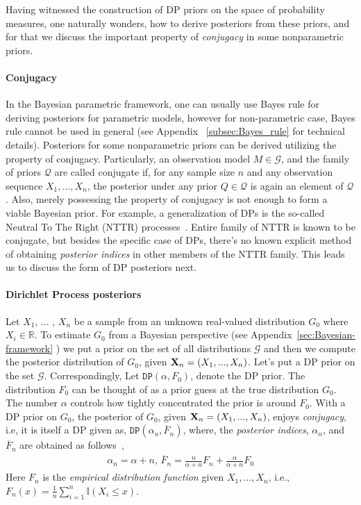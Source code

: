 \documentclass[10pt]{article}
\def\R{\mathbb{R}}
\newcommand{\DP}{\texttt{DP}}
\begin{document}
Having witnessed the construction of DP priors on the space of probability measures, one naturally wonders, how to derive posteriors from these priors, and for that we discuss the important property of \textit{conjugacy} in some nonparametric priors.

\paragraph{Conjugacy} In the Bayesian parametric framework, one can usually use Bayes rule for deriving posteriors for parametric models, however for non-parametric case, Bayes rule cannot be used in general (see Appendix ~\ref{subsec:Bayes_rule} for technical details). Posteriors for some nonparametric priors can be derived utilizing the property of conjugacy. Particularly, an observation model $M \in \mathcal{G}$, and the family of priors $\mathcal{Q}$ are called conjugate if, for any sample size $n$ and any observation sequence $X_{1}, . . ., X_{n}$, the posterior under any prior $Q\in \mathcal{Q}$ is again an element of $\mathcal{Q}$. Also, merely possessing the property of conjugacy is not enough to form a viable Bayesian prior.  For example, a generalization of DPs is the so-called Neutral To The Right (NTTR) processes~\citep{dey2003some}. Entire family of NTTR is  known to be conjugate, but besides the specific case of DPs, there's no known explicit method of obtaining \textit{posterior indices} in other members of the NTTR family. This leads us to discuss the form of DP posteriors next.

\paragraph{Dirichlet Process posteriors} Let $X_1$, ... , $X_n$ be a sample from an unknown real-valued distribution $G_{0}$ where $X_i \in \R$. To estimate $G_{0}$ from a Bayesian perspective (see Appendix~\ref{sec:Bayesian-framework} ) we put a prior on the set of all distributions $\mathcal{G}$ and then we compute the posterior distribution of $G_{0}$, given ${\bf X}_n = (X_1, . . . , X_n)$. Let's put a DP prior   on the set $\mathcal{G}$. Correspondingly, Let $\DP(\alpha,F_{0})$, denote the DP prior. The distribution $F_{0}$ can be thought of as a prior guess at the true distribution $G_{0}$. The
number $\alpha$ controls how tightly concentrated the prior is around $F_0$.  With a DP prior on $G_{0}$, the posterior of $G_{0}$, given ${\bf X}_n = (X_1, . . . , X_n)$, enjoys \textit{conjugacy}, i.e, it is itself a DP given as, $\DP(\alpha_{n},\overline{F}_n)$, where, the \textit{posterior indices}, $\alpha_{n}$, and $\overline{F}_{n}$ are obtained as follows~\citep{ferguson1973bayesian,ghosal2010dirichlet},
\begin{align} \label{def:DP-posteriors}
\alpha_{n} = \alpha + n, \, \overline{F}_n = \frac{n}{\alpha+n}{F}_n + \frac{\alpha}{\alpha+n}F_0 
\end{align}
\noindent Here ${F}_n$ is the \textit{empirical  distribution function} given $X_1,. . .,X_{n}$, i.e., $F_{n}(x) = \frac{1}{n}\sum_{i=1}^{n}\mathbb{I}(X_{i} \le x)$. 
\end{document}
